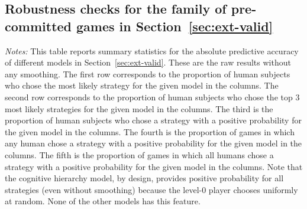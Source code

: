 \subsection{Robustness checks for the family of pre-committed games in Section~\ref{sec:ext-valid}}
\label{app:robustness_checks}

\begin{table}[h!]
\begin{center}
\caption{Summary statistics for absolute predictive accuracy of different models ($\varepsilon = 0$).} 
\label{tab:match_rates}
\footnotesize
\renewcommand{\arraystretch}{1.25}

\end{center}
\begin{footnotesize}
\begin{singlespace}
\vspace*{-0.05in}
\emph{Notes:} This table reports summary statistics for the absolute predictive accuracy of different models in Section~\ref{sec:ext-valid}.
These are the raw results without any smoothing.
The first row corresponds to the proportion of human subjects who chose the most likely strategy for the given model in the columns.
The second row corresponds to the proportion of human subjects who chose the top 3 most likely strategies for the given model in the columns.
The third is the proportion of human subjects who chose a strategy with a positive probability for the given model in the columns.
The fourth is the proportion of games in which any human chose a strategy with a positive probability for the given model in the columns.
The fifth is the proportion of games in which all humans chose a strategy with a positive probability for the given model in the columns.
Note that the cognitive hierarchy model, by design, provides positive probability for all strategies (even without smoothing) because the level-$0$ player chooses uniformly at random.
None of the other models has this feature.
\end{singlespace}
\end{footnotesize}
\end{table}
  

